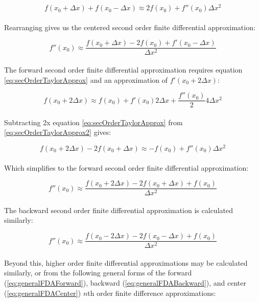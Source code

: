 {   \begin{equation}
  f(x_{0} + \Delta  x) + f(x_{0} - \Delta  x) \approx 2f(x_{0}) + f''(x_{0})\Delta  x^{2}
  \end{equation}
    \\
  Rearranging gives us the centered second order finite differential approximation:
  
   \begin{equation}\label{eq:fdaseccentered}
   f''(x_{0}) \approx \frac{f(x_{0} + \Delta  x) - 2f(x_{0}) + f'(x_{0} -\Delta  x)}{\Delta  x^{2}}
  \end{equation}
    \\
  The forward second order finite differential approximation requires equation \ref{eq:secOrderTaylorApprox} and an approximation of $f'(x_{0} + 2\Delta  x)$:
  
  \begin{equation}\label{eq:secOrderTaylorApprox2}
  f(x_{0} + 2\Delta  x) \approx f(x_{0}) + f'(x_{0})2\Delta  x + \frac{f''(x_{0})}{2}4\Delta  x^{2}
  \end{equation}
    \\
  Subtracting 2x equation \ref{eq:secOrderTaylorApprox} from \ref{eq:secOrderTaylorApprox2} gives:
  
    \begin{equation}
  f(x_{0} + 2\Delta  x) - 2f(x_{0} + \Delta  x) \approx -f(x_{0}) + f''(x_{0})\Delta  x^{2}
  \end{equation}
  \\
Which simplifies to the forward second order finite differential approximation:
  
      \begin{equation}\label{eq:fdasecforward}
f''(x_{0}) \approx \frac{f(x_{0} + 2\Delta  x) - 2f(x_{0} + \Delta  x) + f(x_{0})}{\Delta  x^{2}}
  \end{equation}
  \\
  The backward second order finite differential approximation is calculated similarly:
  
        \begin{equation}\label{eq:fdasecbackward}
f''(x_{0}) \approx \frac{f(x_{0} - 2\Delta  x) - 2f(x_{0} - \Delta  x) + f(x_{0})}{\Delta  x^{2}}
  \end{equation}
  \\
 Beyond this, higher order finite differential approximations may be calculated similarly, or from the following general forms of the forward (\ref{eq:generalFDAForward}), backward (\ref{eq:generalFDABackward}), and center (\ref{eq:generalFDACenter}) $n$th order finite difference approximations:
 
}
